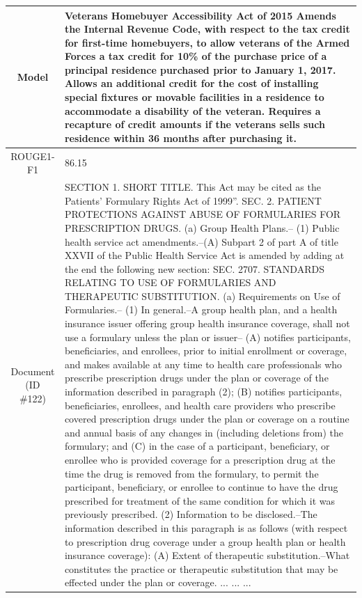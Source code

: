 \begin{table}[bth!]
\begin{tabular}{c|p{}}
\\ \hline
Model & 
Veterans Homebuyer Accessibility Act of 2015 Amends the Internal Revenue Code, with respect to the tax credit for first-time homebuyers, to allow veterans of the Armed Forces a tax credit for 10\% of the purchase price of a principal residence purchased prior to January 1, 2017. Allows an additional credit for the cost of installing special fixtures or movable facilities in a residence to accommodate a disability of the veteran. Requires a recapture of credit amounts if the veterans sells such residence within 36 months after purchasing it.
\\ \hline
ROUGE1-F1 & 
86.15
\\ \hline
\makecell{Document\\(ID \#122)} & 
SECTION 1. SHORT TITLE. This Act may be cited as the   Patients' Formulary Rights Act of 1999''. SEC. 2. PATIENT PROTECTIONS AGAINST ABUSE OF FORMULARIES FOR PRESCRIPTION DRUGS. (a) Group Health Plans.-- (1) Public health service act amendments.--(A) Subpart 2 of part A of title XXVII of the Public Health Service Act is amended by adding at the end the following new section:   SEC. 2707. STANDARDS RELATING TO USE OF FORMULARIES AND THERAPEUTIC SUBSTITUTION.   (a) Requirements on Use of Formularies.--   (1) In general.--A group health plan, and a health insurance issuer offering group health insurance coverage, shall not use a formulary unless the plan or issuer--   (A) notifies participants, beneficiaries, and enrollees, prior to initial enrollment or coverage, and makes available at any time to health care professionals who prescribe prescription drugs under the plan or coverage of the information described in paragraph (2);   (B) notifies participants, beneficiaries, enrollees, and health care providers who prescribe covered prescription drugs under the plan or coverage on a routine and annual basis of any changes in (including deletions from) the formulary; and   (C) in the case of a participant, beneficiary, or enrollee who is provided coverage for a prescription drug at the time the drug is removed from the formulary, to permit the participant, beneficiary, or enrollee to continue to have the drug prescribed for treatment of the same condition for which it was previously prescribed.   (2) Information to be disclosed.--The information described in this paragraph is as follows (with respect to prescription drug coverage under a group health plan or health insurance coverage):   (A) Extent of therapeutic substitution.--What constitutes the practice or therapeutic substitution that may be effected under the plan or coverage.  ... ... ... 

\end{tabular}
\end{table}
